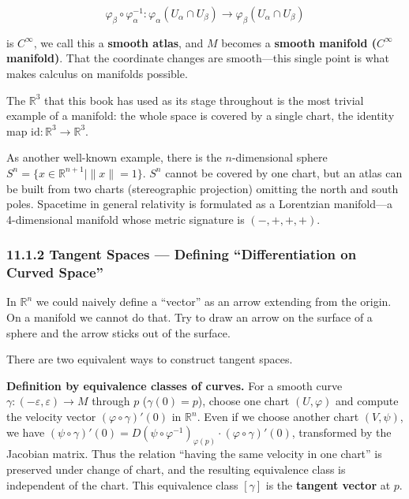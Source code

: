\[\varphi_\beta \circ \varphi_\alpha^{-1}: \varphi_\alpha(U_\alpha \cap U_\beta) \to \varphi_\beta(U_\alpha \cap U_\beta)\]

is \(C^\infty\), we call this a \textbf{smooth atlas}, and \(M\) becomes
a \textbf{smooth manifold (\(C^\infty\) manifold)}. That the coordinate
changes are smooth---this single point is what makes calculus on
manifolds possible.

The \(\mathbb{R}^3\) that this book has used as its stage throughout is
the most trivial example of a manifold: the whole space is covered by a
single chart, the identity map
\(\mathrm{id}: \mathbb{R}^3 \to \mathbb{R}^3\).

As another well-known example, there is the \(n\)-dimensional sphere
\(S^n = \{x \in \mathbb{R}^{n+1} \mid \|x\| = 1\}\). \(S^n\) cannot be
covered by one chart, but an atlas can be built from two charts
(stereographic projection) omitting the north and south poles. Spacetime
in general relativity is formulated as a Lorentzian manifold---a
4-dimensional manifold whose metric signature is \((-,+,+,+)\).

\hypertarget{tangent-spaces-defining-differentiation-on-curved-space}{%
\subsubsection{11.1.2 Tangent Spaces --- Defining ``Differentiation on
Curved
Space''}\label{tangent-spaces-defining-differentiation-on-curved-space}}

In \(\mathbb{R}^n\) we could naively define a ``vector'' as an arrow
extending from the origin. On a manifold we cannot do that. Try to draw
an arrow on the surface of a sphere and the arrow sticks out of the
surface.

There are two equivalent ways to construct tangent spaces.

\textbf{Definition by equivalence classes of curves.} For a smooth curve
\(\gamma: (-\varepsilon, \varepsilon) \to M\) through \(p\)
(\(\gamma(0)=p\)), choose one chart \((U, \varphi)\) and compute the
velocity vector \((\varphi \circ \gamma)'(0)\) in \(\mathbb{R}^n\). Even
if we choose another chart \((V, \psi)\), we have
\((\psi \circ \gamma)'(0) = D(\psi \circ \varphi^{-1})_{\varphi(p)} \cdot (\varphi \circ \gamma)'(0)\),
transformed by the Jacobian matrix. Thus the relation ``having the same
velocity in one chart'' is preserved under change of chart, and the
resulting equivalence class is independent of the chart. This
equivalence class \([\gamma]\) is the \textbf{tangent vector} at \(p\).

